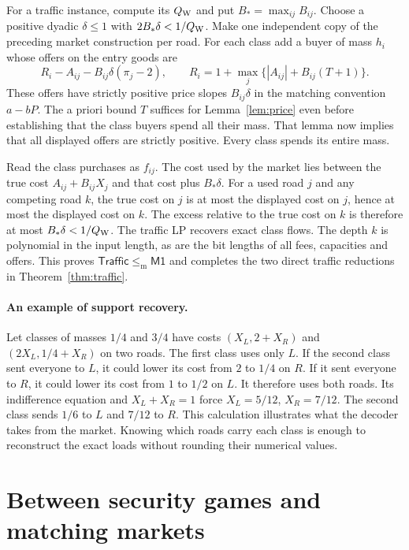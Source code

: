 \documentclass[11pt]{article}
\newcommand{\Market}{\mathsf{M1}}
\newcommand{\Traffic}{\mathsf{Traffic}}
\newcommand{\dd}{\mathrel{\leq_{\mathrm m}}}
\begin{document}
For a traffic instance, compute its \(Q_{\rm W}\) and put \(B_*=\max_{ij}B_{ij}\).
Choose a positive dyadic \(\delta\le1\) with \(2B_*\delta<1/Q_{\rm W}\).
Make one independent copy of the preceding market construction per road.
For each class add a buyer of mass \(h_i\) whose offers on the entry goods
are
\[
 R_i-A_{ij}-B_{ij}\delta(\pi_j-2),\qquad
 R_i=1+\max_j\{|A_{ij}|+B_{ij}(T+1)\}.
\]
These offers have strictly positive price slopes \(B_{ij}\delta\) in
the matching convention \(a-bP\). The a priori bound \(T\) suffices for
Lemma~\ref{lem:price} even before establishing that the class buyers spend
all their mass. That lemma now implies that all displayed offers are
strictly positive. Every class spends its entire mass.

Read the class purchases as \(f_{ij}\). The cost used by the market lies
between the true cost \(A_{ij}+B_{ij}X_j\) and that cost plus \(B_*\delta\).
For a used road \(j\) and any competing road \(k\), the true cost on \(j\)
is at most the displayed cost on \(j\), hence at most the displayed cost
on \(k\). The excess relative to the true cost on \(k\) is therefore at
most \(B_*\delta<1/Q_{\rm W}\). The traffic LP recovers exact class flows.
The depth \(k\) is polynomial in the input length, as are the bit lengths of
all fees, capacities and offers. This proves \(\Traffic\dd\Market\) and
completes the two direct traffic reductions in Theorem~\ref{thm:traffic}.

\paragraph{An example of support recovery.}
Let classes of masses \(1/4\) and \(3/4\) have costs
\((X_L,2+X_R)\) and \((2X_L,1/4+X_R)\) on two roads. The first class uses
only \(L\). If the second class sent everyone to \(L\), it could lower
its cost from \(2\) to \(1/4\) on \(R\). If it sent everyone to \(R\),
it could lower its cost from \(1\) to \(1/2\) on \(L\).
It therefore uses both roads. Its indifference equation and
\(X_L+X_R=1\) force \(X_L=5/12\), \(X_R=7/12\). The second class sends
\(1/6\) to \(L\) and \(7/12\) to \(R\). This calculation illustrates what the
decoder takes from the market. Knowing which roads carry each class is
enough to reconstruct the exact loads without rounding their numerical values.

\section{Between security games and matching markets}\label{sec:bridge}
\end{document}
